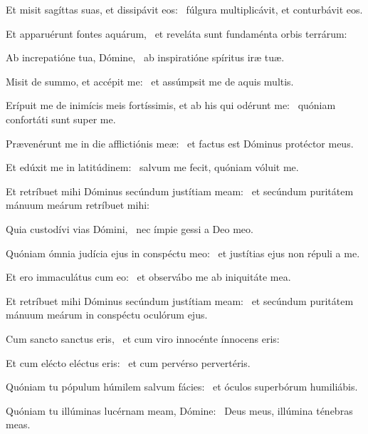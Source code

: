 \item Et misit sagíttas suas, et dissipávit eos:~\psstar{} fúlgura multiplicávit, et conturbávit eos.

\item Et apparuérunt fontes aquárum,~\psstar{} et reveláta sunt fundaménta orbis terrárum:

\item Ab increpatióne tua, Dómine,~\psstar{} ab inspiratióne spíritus iræ tuæ.

\item Misit de summo, et accépit me:~\psstar{} et assúmpsit me de aquis multis.

\item Erípuit me de inimícis meis fortíssimis, et ab his qui odérunt me:~\psstar{} quóniam confortáti sunt super me.

\item Prævenérunt me in die afflictiónis meæ:~\psstar{} et factus est Dóminus protéctor meus.

\item Et edúxit me in latitúdinem:~\psstar{} salvum me fecit, quóniam vóluit me.

\item Et retríbuet mihi Dóminus secúndum justítiam meam:~\psstar{} et secúndum puritátem mánuum meárum retríbuet mihi:

\item Quia custodívi vias Dómini,~\psstar{} nec ímpie gessi a Deo meo.

\item Quóniam ómnia judícia ejus in conspéctu meo:~\psstar{} et justítias ejus non répuli a me.

\item Et ero immaculátus cum eo:~\psstar{} et observábo me ab iniquitáte mea.

\item Et retríbuet mihi Dóminus secúndum justítiam meam:~\psstar{} et secúndum puritátem mánuum meárum in conspéctu oculórum ejus.

\item Cum sancto sanctus eris,~\psstar{} et cum viro innocénte ínnocens eris:

\item Et cum elécto eléctus eris:~\psstar{} et cum pervérso pervertéris.

\item Quóniam tu pópulum húmilem salvum fácies:~\psstar{} et óculos superbórum humiliábis.

\item Quóniam tu illúminas lucérnam meam, Dómine:~\psstar{} Deus meus, illúmina ténebras meas.

